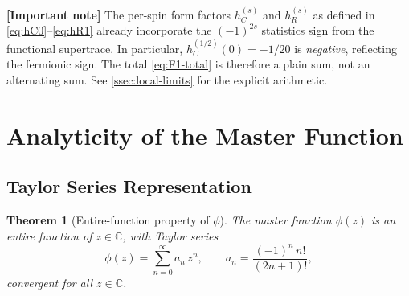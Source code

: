 \documentclass[11pt,a4paper]{article}
\theoremstyle{plain}
\newtheorem{theorem}{Theorem}[section]
\theoremstyle{definition}
\newcommand{\signcorrection}[1]{%
  \par\smallskip\noindent
  \colorbox{red!10}{\parbox{\dimexpr\linewidth-2\fboxsep}{%
    \textcolor{red!60!black}{\textbf{[Important note]}} #1}}%
  \par\smallskip}
\begin{document}
\signcorrection{The per-spin form factors $h_C^{(s)}$ and $h_R^{(s)}$
as defined in \cref{eq:hC0}--\cref{eq:hR1} already incorporate the
$(-1)^{2s}$ statistics sign from the functional supertrace. In particular,
$h_C^{(1/2)}(0) = -1/20$ is \emph{negative}, reflecting the fermionic
sign. The total \cref{eq:F1-total} is therefore a plain sum, not an
alternating sum. See \cref{ssec:local-limits} for the explicit arithmetic.}

\section{Analyticity of the Master Function}\label{sec:analyticity}

\subsection{Taylor Series Representation}

\begin{theorem}[Entire-function property of $\phi$]\label{thm:phi-entire}
The master function $\phi(z)$ is an entire function of $z \in \mathbb{C}$,
with Taylor series
\begin{equation}\label{eq:phi-taylor}
  \phi(z) = \sum_{n=0}^{\infty} a_n\, z^n,\qquad
  a_n = \frac{(-1)^n\, n!}{(2n+1)!},
\end{equation}
convergent for all $z \in \mathbb{C}$.
\end{theorem}
\end{document}
